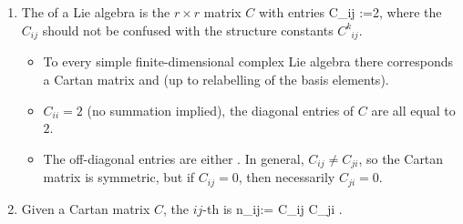 \documentclass{article}
\begin{document}
\begin{enumerate}
\item {}
The  of a Lie algebra is the $r\times r$ matrix $C$ with entries
\bse
C_{ij} :=2,
\ese
where the $C_{ij}$ should not be confused with the structure constants $C^k_{\phantom{k}ij}$.
\begin{itemize}
    \item {} To every simple finite-dimensional complex Lie algebra there corresponds a  Cartan matrix and  (up to relabelling of the basis elements).
    \item  {} $C_{ii}=2$ (no summation implied), the diagonal entries of $C$ are all equal to $2$.
    \item {} The off-diagonal entries are either . In general, $C_{ij} \neq C_{ji}$, so the Cartan matrix is  symmetric, but if $C_{ij}=0$, then necessarily $C_{ji}=0$.
\end{itemize}

    \item {}
Given a Cartan matrix $C$, the $ij$-th  is
\bse
n_{ij}:= C_{ij} C_{ji} \qquad {}.
\ese


\end{enumerate}
\end{document}
